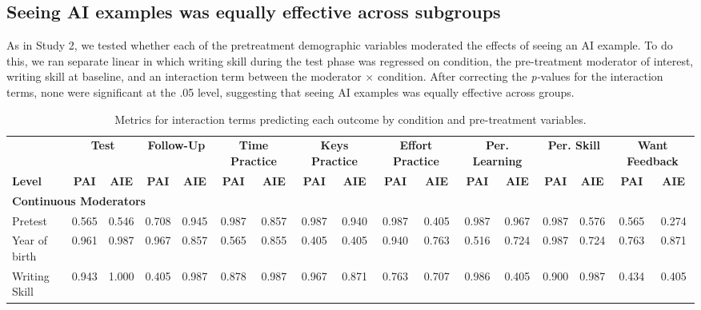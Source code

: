 \documentclass[11pt]{report}
\begin{document}
\begin{append}
\subsection{Seeing AI examples was equally effective across subgroups}
As in Study 2, we tested whether each of the pretreatment demographic variables moderated the effects of seeing an AI example. To do this, we ran separate linear in which writing skill during the test phase was regressed on condition, the pre-treatment moderator of interest, writing skill at baseline, and an interaction term between the moderator $\times$ condition. After correcting the \textit{p-}values for the interaction terms, none were significant at the .05 level, suggesting that seeing AI examples was equally effective across groups.

\begin{landscape}
\begin{table}[h]
    \centering
    \footnotesize
    \caption{Metrics for interaction terms predicting each outcome by condition and pre-treatment variables.}
    \label{tab:interactions3}
    \begin{tabular}{@{\extracolsep{-4pt}}lcccccccccccccccc}
    \toprule
    & \multicolumn{2}{c}{\textbf{Test}} & \multicolumn{2}{c}{\textbf{Follow-Up}} & \multicolumn{2}{c}{\textbf{Time Practice}} & \multicolumn{2}{c}{\textbf{Keys Practice}} & \multicolumn{2}{c}{\textbf{Effort Practice}} & \multicolumn{2}{c}{\textbf{Per. Learning}} & \multicolumn{2}{c}{\textbf{Per. Skill}} & \multicolumn{2}{c}{\textbf{Want Feedback}} \\ 
    \cmidrule(lr){2-3} \cmidrule(lr){4-5} \cmidrule(lr){6-7} \cmidrule(lr){8-9} \cmidrule(lr){10-11} \cmidrule(lr){12-13} \cmidrule(lr){14-15} \cmidrule(lr){16-17}
    \textbf{Level} & \textbf{PAI} & \textbf{AIE} & \textbf{PAI} & \textbf{AIE} & \textbf{PAI} & \textbf{AIE} & \textbf{PAI} & \textbf{AIE} & \textbf{PAI} & \textbf{AIE} & \textbf{PAI} & \textbf{AIE} & \textbf{PAI} & \textbf{AIE} & \textbf{PAI} & \textbf{AIE} \\ 
    \midrule
    
    \multicolumn{17}{l}{\textbf{Continuous Moderators}} \\ 
    \midrule
    Pretest & 0.565 & 0.546 & 0.708 & 0.945 & 0.987 & 0.857 & 0.987 & 0.940 & 0.987 & 0.405 & 0.987 & 0.967 & 0.987 & 0.576 & 0.565 & 0.274 \\ 
    Year of birth & 0.961 & 0.987 & 0.967 & 0.857 & 0.565 & 0.855 & 0.405 & 0.405 & 0.940 & 0.763 & 0.516 & 0.724 & 0.987 & 0.724 & 0.763 & 0.871 \\ 
    Writing Skill & 0.943 & 1.000 & 0.405 & 0.987 & 0.878 & 0.987 & 0.967 & 0.871 & 0.763 & 0.707 & 0.986 & 0.405 & 0.900 & 0.987 & 0.434 & 0.405 \\ 
    \midrule
    

\end{tabular}
\end{table}
\end{landscape}
\end{append}
\end{document}
